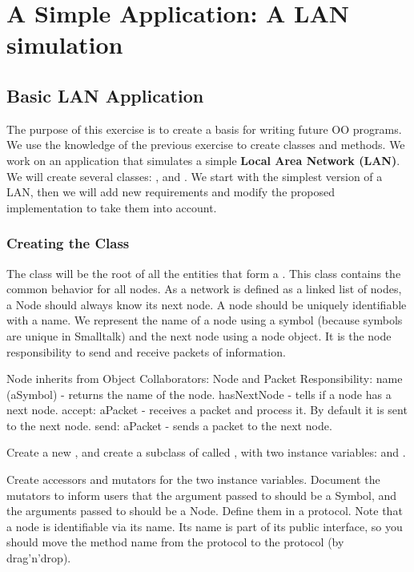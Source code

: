 \ifx\wholebook\relax\else


\fi

\chapter{A Simple Application: A LAN simulation}
\section*{Basic LAN Application }

The purpose of this exercise is to create a basis for writing
future OO programs. We use the knowledge of the previous
exercise to create classes and methods. We work on an
application that simulates a simple \textbf{Local Area Network (LAN)}.  We will
create several classes: , and
. We start with the simplest version of a LAN,
then we will add new requirements and modify the proposed
implementation to take them into account.

\subsection*{Creating the Class }

The class  will be the root of all the entities that
form a . This class contains the common behavior
for all nodes. As a network is defined as a linked list
of nodes, a Node should always know its next node. A node should be
uniquely identifiable with a name. We represent the name of a node
using a symbol (because symbols are unique in Smalltalk) and the
next node using a node object. It is the node responsibility to
send and receive packets of information.

\begin{code}
Node inherits from Object
Collaborators: Node and Packet
Responsibility:
name (aSymbol) - returns the name of the node.
hasNextNode - tells if a node has a next node.
accept: aPacket - receives a packet and process it.
By default it is sent to the next node.
send: aPacket - sends a packet to the next node.
\end{code}


\exercise  Create a new \category {}, and create a
subclass of  called , with two instance
variables:  and .

\exercise  Create accessors and mutators for the two instance
variables. Document the mutators to inform users that the argument
passed to  should be a Symbol, and the arguments
passed to  should be a Node. Define them in a
 protocol. Note that a node is identifiable via
its name. Its name is part of its public interface, so you should
move the method name from the  protocol to the
 protocol (by drag'n'drop). \\

